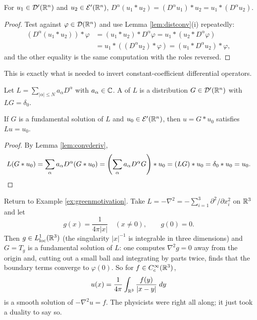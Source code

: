 \documentclass[a4paper]{scrartcl}
\newcommand{\Ecal}{\mathcal{E}}
\begin{document}
\begin{lemma}\label{lem:convderiv}
	For $u_1\in\mathcal{D}'(\mathbb{R}^n)$ and $u_2\in\Ecal'(\R^n)$, $D^\alpha(u_1*u_2)=(D^\alpha u_1)*u_2 = u_1*(D^\alpha u_2)$.
\end{lemma}

\begin{proof}
	Test against $\varphi \in \mathcal{D}(\mathbb{R}^n)$ and use Lemma \ref{lem:distconv}(i) repeatedly:
	\begin{align*}
		(D^\alpha(u_1*u_2))*\varphi &= (u_1*u_2)*D^\alpha\varphi = u_1*(u_2*D^\alpha\varphi) \\
		&= u_1*((D^\alpha u_2)*\varphi)=(u_1*D^\alpha u_2)*\varphi,
	\end{align*}
	and the other equality is the same computation with the roles reversed.
\end{proof}

This is exactly what is needed to invert constant-coefficient differential operators.

\begin{definition}
	Let $L=\sum_{|\alpha|\le N}a_\alpha D^\alpha$ with $a_\alpha \in\mathbb{C}$. A  of $L$ is a distribution $G \in \mathcal{D}'(\mathbb{R}^n)$ with $LG=\delta_0$.
\end{definition}

\begin{theorem}\label{thm:fundsol}
	If $G$ is a fundamental solution of $L$ and $u_0 \in \Ecal'(\R^n)$, then $u = G * u_0$ satisfies $Lu = u_0$.
\end{theorem}

\begin{proof}
	By Lemma \ref{lem:convderiv},
	$$L(G*u_0)=\sum_\alpha a_\alpha D^\alpha(G*u_0)=\left(\sum_\alpha a_\alpha D^\alpha G\right)*u_0=(LG)*u_0=\delta_0*u_0=u_0. \qedhere$$
\end{proof}

\begin{example}
	Return to Example \ref{ex:greenmotivation}. Take $L=-\nabla^2=-\sum_{i=1}^3\partial^2/\partial x_i^2$ on $\mathbb{R}^3$ and let
	$$g(x)=\frac{1}{4\pi|x|} \quad (x\ne0), \qquad g(0)=0.$$
	Then $g \in L^1_{\mathrm{loc}}(\mathbb{R}^3)$ (the singularity $|x|^{-1}$ is integrable in three dimensions) and $G = T_g$ is a fundamental solution of $L$: one computes $\nabla^2 g = 0$ away from the origin and, cutting out a small ball and integrating by parts twice, finds that the boundary terms converge to $\varphi(0)$. So for $f \in C_c^\infty(\mathbb{R}^3)$,
	$$u(x)=\frac{1}{4\pi}\int_{\mathbb{R}^3}\frac{f(y)}{|x-y|}\; d y$$
	is a smooth solution of $-\nabla^2u=f$. The physicists were right all along; it just took a duality to say so.
\end{example}
\end{document}
